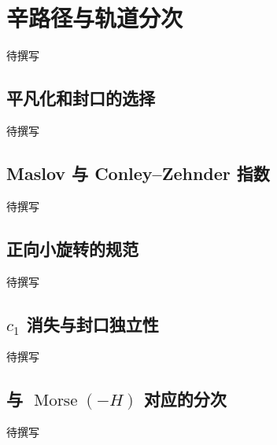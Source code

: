 
% 
% 

\section{辛路径与轨道分次}
\label{g4:sec:2503}

待撰写

\subsection{平凡化和封口的选择}
\label{g4:subsec:2503:01}
待撰写

\subsection{Maslov 与 Conley–Zehnder 指数}
\label{g4:subsec:2503:02}
待撰写

\subsection{正向小旋转的规范}
\label{g4:subsec:2503:03}
待撰写

\subsection{\texorpdfstring{\(c_1\) 消失与封口独立性}{c₁ 消失与封口独立性}}
\label{g4:subsec:2503:04}
待撰写

\subsection{\texorpdfstring{与 \(\operatorname{Morse}(-H)\) 对应的分次}{与 Morse(−H) 对应的分次}}
\label{g4:subsec:2503:05}
待撰写

